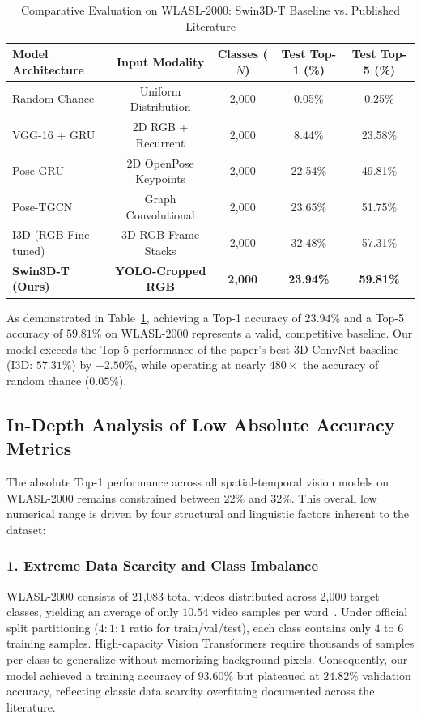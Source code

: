 \documentclass[12pt,a4paper]{article}
\begin{document}
\begin{table}[htbp]
\centering
\small
\setlength{\tabcolsep}{5pt} %
\caption{Comparative Evaluation on WLASL-2000: Swin3D-T Baseline vs. Published Literature}
\label{tab:wlasl2000_comparison}
\begin{tabular}{lcccc}
\toprule
\textbf{Model Architecture} & \textbf{Input Modality} & \textbf{Classes ($N$)} & \textbf{Test Top-1 (\%)} & \textbf{Test Top-5 (\%)} \\
\midrule
Random Chance & Uniform Distribution & 2,000 & 0.05\% & 0.25\% \\
VGG-16 + GRU~\cite{li2020wordlevel} & 2D RGB + Recurrent & 2,000 & 8.44\% & 23.58\% \\
Pose-GRU~\cite{li2020wordlevel} & 2D OpenPose Keypoints & 2,000 & 22.54\% & 49.81\% \\
Pose-TGCN~\cite{li2020wordlevel} & Graph Convolutional & 2,000 & 23.65\% & 51.75\% \\
I3D (RGB Fine-tuned)~\cite{li2020wordlevel} & 3D RGB Frame Stacks & 2,000 & 32.48\% & 57.31\% \\
\midrule
\textbf{Swin3D-T (Ours)} & \textbf{YOLO-Cropped RGB} & \textbf{2,000} & \textbf{23.94\%} & \textbf{59.81\%} \\
\bottomrule
\end{tabular}
\end{table}

As demonstrated in Table~\ref{tab:wlasl2000_comparison}, achieving a Top-1 accuracy of $23.94\%$ and a Top-5 accuracy of $59.81\%$ on WLASL-2000 represents a valid, competitive baseline. Our model exceeds the Top-5 performance of the paper's best 3D ConvNet baseline (I3D: $57.31\%$) by $+2.50\%$, while operating at nearly $480\times$ the accuracy of random chance ($0.05\%$).

\subsection{In-Depth Analysis of Low Absolute Accuracy Metrics}
The absolute Top-1 performance across all spatial-temporal vision models on WLASL-2000 remains constrained between $22\%$ and $32\%$. This overall low numerical range is driven by four structural and linguistic factors inherent to the dataset:

\subsubsection{1. Extreme Data Scarcity and Class Imbalance}
WLASL-2000 consists of 21,083 total videos distributed across 2,000 target classes, yielding an average of only $10.54$ video samples per word~\cite{li2020wlasl}. Under official split partitioning ($4:1:1$ ratio for train/val/test), each class contains only $4$ to $6$ training samples. High-capacity Vision Transformers require thousands of samples per class to generalize without memorizing background pixels. Consequently, our model achieved a training accuracy of $93.60\%$ but plateaued at $24.82\%$ validation accuracy, reflecting classic data scarcity overfitting documented across the literature.
\end{document}
